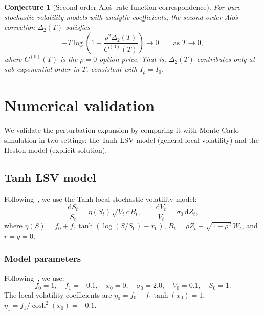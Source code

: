 \documentclass[11pt]{article}
\newtheorem{conjecture}[theorem]{Conjecture}
\theoremstyle{definition}
\newcommand{\dd}{\mathrm{d}}
\begin{document}
\begin{conjecture}[Second-order Alo\`s--rate function correspondence]\label{conj:second_order_alos}
For pure stochastic volatility models with analytic coefficients, the second-order Alo\`s correction $\Delta_2(T)$ satisfies
\begin{equation}
  -T\log\!\left(1 + \frac{\rho^2\Delta_2(T)}{C^{(0)}(T)}\right) \to 0 \qquad \text{as } T \to 0,
\end{equation}
where $C^{(0)}(T)$ is the $\rho=0$ option price. That is, $\Delta_2(T)$ contributes only at sub-exponential order in $T$, consistent with $I_\rho = I_0$.
\end{conjecture}

\section{Numerical validation}\label{sec:numerical}

We validate the perturbation expansion by comparing it with Monte Carlo simulation in two settings: the Tanh LSV model (general local volatility) and the Heston model (explicit solution).

\subsection{Tanh LSV model}\label{sec:tanh_model}

Following~\cite{PWZ2025}, we use the Tanh local-stochastic volatility model:
\begin{equation}\label{eq:Tanh_model}
  \frac{\dd S_t}{S_t} = \eta(S_t)\sqrt{V_t}\,\dd B_t, \qquad \frac{\dd V_t}{V_t} = \sigma_0\,\dd Z_t,
\end{equation}
where $\eta(S) = f_0 + f_1\tanh(\log(S/S_0) - x_0)$, $B_t = \rho Z_t + \sqrt{1-\rho^2}\,W_t$, and $r = q = 0$.

\subsubsection{Model parameters}

Following~\cite{PWZ2025}, we use:
\begin{equation}\label{eq:params}
  f_0 = 1,\quad f_1 = -0.1,\quad x_0 = 0,\quad \sigma_0 = 2.0,\quad V_0 = 0.1,\quad S_0 = 1.
\end{equation}
The local volatility coefficients are $\eta_0 = f_0 - f_1\tanh(x_0) = 1$, $\eta_1 = f_1/\cosh^2(x_0) = -0.1$.
\end{document}
